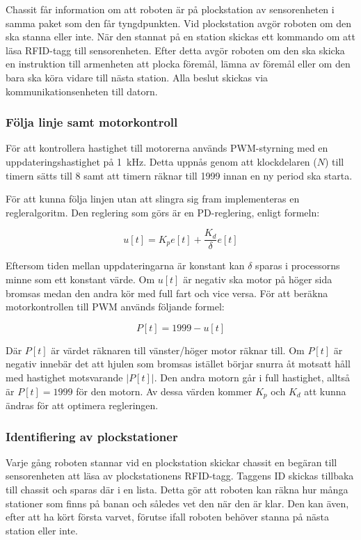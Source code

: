 Chassit får information om att roboten är på plockstation av sensorenheten i samma paket som den får tyngdpunkten. Vid plockstation avgör roboten om den ska stanna eller inte. När den stannat på en station skickas ett kommando om att läsa RFID-tagg till sensorenheten. Efter detta avgör roboten om den ska skicka en instruktion till armenheten att  plocka föremål, lämna av föremål eller om den bara ska köra vidare till nästa station. Alla beslut skickas via kommunikationsenheten till datorn.


\subsubsection{Följa linje samt motorkontroll}
\label{följalinje}

För att kontrollera hastighet till motorerna används PWM-styrning med en uppdateringshastighet på 1~kHz. Detta uppnås genom att klockdelaren ($N$) till timern sätts till 8 samt att timern räknar till 1999 innan en ny period ska starta. 

För att kunna följa linjen utan att slingra sig fram implementeras en regleralgoritm. Den reglering som görs är en PD-reglering, enligt formeln:

$$u[t] = K_{p}e[t] +\frac{K_{d}}{ \delta}e[t]$$

Eftersom tiden mellan uppdateringarna är konstant kan $ \delta $ sparas i processorns minne som ett konstant värde. Om $u[t]$ är negativ ska motor på höger sida  bromsas medan den andra kör med full fart och vice versa. För att beräkna motorkontrollen till PWM används följande formel:

$$P[t] = 1999 - u[t]$$

Där $P[t]$ är värdet räknaren till vänster/höger motor räknar till. Om $P[t]$ är negativ innebär det att hjulen som bromsas istället börjar snurra åt motsatt håll med hastighet motsvarande $|P[t]|$. Den andra motorn går i full hastighet, alltså är $P[t] = 1999$ för den motorn. Av dessa värden kommer $K_{p}$ och $K_{d}$ att kunna ändras för att optimera regleringen.


\subsubsection{Identifiering av plockstationer}

Varje gång roboten stannar vid en plockstation skickar chassit en begäran till sensorenheten att läsa av plockstationens RFID-tagg. Taggens ID skickas tillbaka till chassit och sparas där i en lista. Detta gör att roboten kan räkna hur många stationer som finns på banan och således vet den när den är klar. Den kan även, efter att ha kört första varvet, förutse ifall roboten behöver stanna på nästa station eller inte. 


